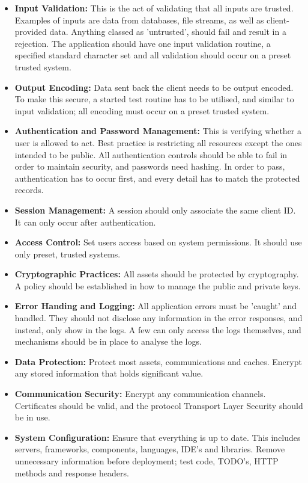 \begin{itemize}
\item \textbf{Input Validation:} This is the act of validating that all inputs are trusted. Examples of inputs are data from databases, file streams, as well as client-provided data. Anything classed as 'untrusted',  should fail and result in a rejection. The application should have one input validation routine, a specified standard character set and all validation should occur on a preset trusted system. 
\item \textbf{Output Encoding:} Data sent back the client needs to be output encoded. To make this secure, a started test routine has to be utilised, and similar to input validation; all encoding must occur on a preset trusted system. 
\item \textbf{Authentication and Password Management:} This is verifying whether a user is allowed to act. Best practice is restricting all resources except the ones intended to be public. All authentication controls should be able to fail in order to maintain security, and passwords need hashing.  In order to pass, authentication has to occur first, and every detail has to match the protected records. 
\item \textbf{Session Management:} A session should only associate the same client ID. It can only occur after authentication. 
\item \textbf{Access Control:} Set users access based on system permissions. It should use only preset, trusted systems. 
\item \textbf{Cryptographic Practices:} All assets should be protected by cryptography. A policy should be established in how to manage the public and private keys. 
\item \textbf{Error Handing and Logging:} All application errors must be 'caught' and handled. They should not disclose any information in the error responses, and instead, only show in the logs. A few can only access the logs themselves, and mechanisms should be in place to analyse the logs. 
\item \textbf{Data Protection:} Protect most assets, communications and caches. Encrypt any stored information that holds significant value. 
\item \textbf{Communication Security:} Encrypt any communication channels. Certificates should be valid, and the protocol Transport Layer Security should be in use. 
\item \textbf{System Configuration:} Ensure that everything is up to date. This includes servers, frameworks, components, languages, IDE's and libraries. Remove unnecessary information before deployment; test code, TODO's, HTTP methods and response headers. 

\end{itemize}

